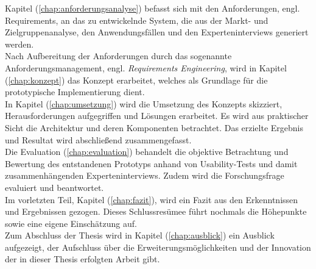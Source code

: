     Kapitel (\ref{chap:anforderungsanalyse}) befasst sich mit den Anforderungen, engl. Requirements, an das zu 
    entwickelnde System, die aus der Markt- und Zielgruppenanalyse, den Anwendungsfällen und den Experteninterviews generiert werden. 
    \\
    \linebreak 
    Nach Aufbereitung der Anforderungen durch das sogenannte Anforderungsmanagement, engl. \textit{Requirements Engineering},
    wird in Kapitel (\ref{chap:konzept}) das Konzept erarbeitet, welches als Grundlage für die prototypische Implementierung dient. 
    \\
    \linebreak
    In Kapitel (\ref{chap:umsetzung}) wird die Umsetzung des Konzepts skizziert, Herausforderungen aufgegriffen und Lösungen erarbeitet. 
    Es wird aus praktischer Sicht die Architektur und deren Komponenten betrachtet. Das erzielte Ergebnis und Resultat wird 
    abschließend zusammengefasst.
    \\
    \linebreak
    Die Evaluation (\ref{chap:evaluation}) behandelt die objektive Betrachtung und Bewertung des entstandenen Prototyps 
    anhand von Usability-Tests und damit zusammenhängenden Experteninterviews. Zudem wird 
    die Forschungsfrage evaluiert und beantwortet. 
    \\
    \linebreak
    Im vorletzten Teil, Kapitel (\ref{chap:fazit}), wird ein Fazit aus den Erkenntnissen und Ergebnissen gezogen. Dieses Schlussresümee 
    führt nochmals die Höhepunkte sowie eine eigene Einschätzung auf. 
    \\
    \linebreak
    Zum Abschluss der Thesis wird in Kapitel (\ref{chap:ausblick}) ein Ausblick aufgezeigt, der Aufschluss über die Erweiterungsmöglichkeiten 
    und der Innovation der in dieser Thesis erfolgten Arbeit gibt. 
